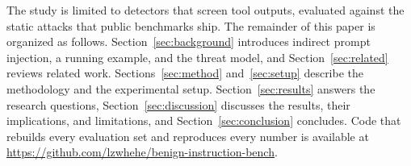 The study is limited to detectors that screen tool outputs, evaluated against the static attacks that public benchmarks ship. The remainder of this paper is organized as follows. Section~\ref{sec:background} introduces indirect prompt injection, a running example, and the threat model, and Section~\ref{sec:related} reviews related work. Sections~\ref{sec:method} and~\ref{sec:setup} describe the methodology and the experimental setup. Section~\ref{sec:results} answers the research questions, Section~\ref{sec:discussion} discusses the results, their implications, and limitations, and Section~\ref{sec:conclusion} concludes. Code that rebuilds every evaluation set and reproduces every number is available at \url{https://github.com/lzwhehe/benign-instruction-bench}.
